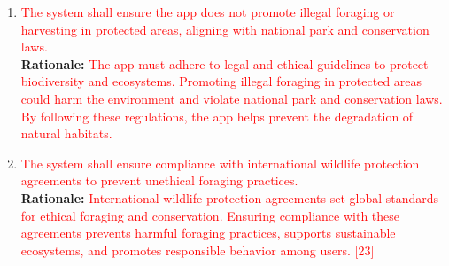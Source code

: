 \documentclass{article}
\begin{document}
\begin{enumerate}[{CP-P}1. ]

	\item \textcolor{red}{The system shall ensure the app does not promote illegal foraging or harvesting in protected areas, aligning with national park and conservation laws.}\\
	\textbf{Rationale:} \textcolor{red}{The app must adhere to legal and ethical guidelines to protect biodiversity and ecosystems. Promoting illegal foraging in protected areas could harm the environment and violate national park and conservation laws. By following these regulations, the app helps prevent the degradation of natural habitats.}\\

	\item \textcolor{red}{The system shall ensure compliance with international wildlife protection agreements to prevent unethical foraging practices.}\\
	\textbf{Rationale:} \textcolor{red}{International wildlife protection agreements set global standards for ethical foraging and conservation. Ensuring compliance with these agreements prevents harmful foraging practices, supports sustainable ecosystems, and promotes responsible behavior among users. [23]}\\


\end{enumerate}
\end{document}
